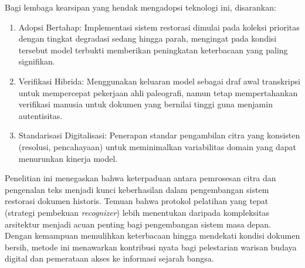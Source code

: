 \documentclass[12pt,a4paper]{article}
\begin{document}
Bagi lembaga kearsipan yang hendak mengadopsi teknologi ini, disarankan:
\begin{enumerate}[leftmargin=1.5em, labelsep=0.5em, itemindent=0pt, noitemsep, topsep=0pt, partopsep=0pt]
  \item Adopsi Bertahap: Implementasi sistem restorasi dimulai pada koleksi prioritas dengan tingkat degradasi sedang hingga parah, mengingat pada kondisi tersebut model terbukti memberikan peningkatan keterbacaan yang paling signifikan.
  \item Verifikasi Hibrida: Menggunakan keluaran model sebagai draf awal transkripsi untuk mempercepat pekerjaan ahli paleografi, namun tetap mempertahankan verifikasi manusia untuk dokumen yang bernilai tinggi guna menjamin autentisitas.
  \item Standarisasi Digitalisasi: Penerapan standar pengambilan citra yang konsisten (resolusi, pencahayaan) untuk meminimalkan variabilitas domain yang dapat menurunkan kinerja model.
\end{enumerate}



Penelitian ini menegaskan bahwa keterpaduan antara pemrosesan citra dan pengenalan teks menjadi kunci keberhasilan dalam pengembangan sistem restorasi dokumen historis. Temuan bahwa protokol pelatihan yang tepat (strategi pembekuan \textit{recognizer}) lebih menentukan daripada kompleksitas arsitektur menjadi acuan penting bagi pengembangan sistem masa depan. Dengan kemampuan memulihkan keterbacaan hingga mendekati kondisi dokumen bersih, metode ini menawarkan kontribusi nyata bagi pelestarian warisan budaya digital dan pemerataan akses ke informasi sejarah bangsa.
\end{document}
